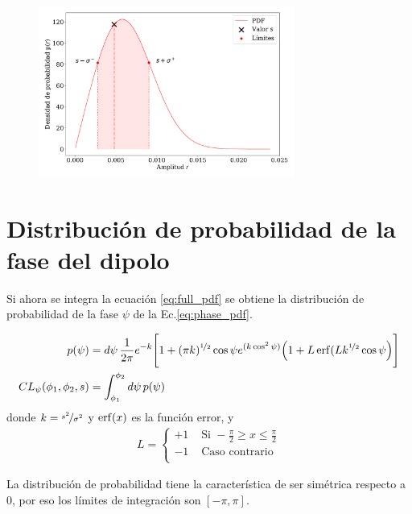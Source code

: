 \begin{figure}[H]
    \begin{small}
        \begin{center}
            \includegraphics[width=0.75\textwidth]{bessel_prob_ej_v2.pdf}
        \end{center}
        \caption{}
    \end{small}
\end{figure}

\section{Distribución de probabilidad de la  fase del dipolo}

Si ahora se integra la ecuación \ref{eq:full_pdf} se obtiene la distribución de probabilidad de la fase $\psi$ de la Ec.\ref{eq:phase_pdf}.  

\begin{align}
    p(\psi) &=d\psi\,\frac{1}{2\pi}e^{-k} \Bigg[ 1 + (\pi k)^{\nicefrac{1}{2}} \cos\psi e^{(k\cos^2\psi)} \Big( 1 + L \erf(L k^{\nicefrac{1}{2}} \cos\psi \Big) \Bigg ] \\ \label{eq:phase_pdf}
    CL_{\psi}(\phi_1, \phi_2, s) &= \int_{\phi_1}^{\phi_2} d\psi \, p(\psi)
\end{align}  
donde $k =\nicefrac{s^2}{\sigma^2}$ y $\erf (x)$ es la función error, y
\begin{align*}
    L =
    \begin{cases} 
        +1 & \text{ Si } -\frac{\pi}{2} \geq x\leq \frac{\pi}{2} \\
        -1 & \text{ Caso contrario }  \\
     \end{cases}
\end{align*}

La distribución de probabilidad tiene la característica  de ser simétrica respecto a 0, por eso los límites de integración son $[-\pi, \pi]$.

